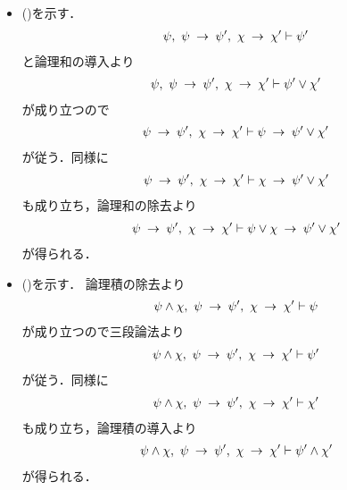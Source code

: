 	\begin{sketch}\mbox{}
		\begin{itemize}
			\item ()を示す．
				\begin{align}
					\psi,\ \psi \rarrow \psi',\ \chi \rarrow \chi' \vdash \psi'
				\end{align}
				と論理和の導入より
				\begin{align}
					\psi,\ \psi \rarrow \psi',\ \chi \rarrow \chi' \vdash \psi' \vee \chi'
				\end{align}
				が成り立つので
				\begin{align}
					\psi \rarrow \psi',\ \chi \rarrow \chi' \vdash 
					\psi \rarrow \psi' \vee \chi'
				\end{align}
				が従う．同様に
				\begin{align}
					\psi \rarrow \psi',\ \chi \rarrow \chi' \vdash 
					\chi \rarrow \psi' \vee \chi'
				\end{align}
				も成り立ち，論理和の除去より
				\begin{align}
					\psi \rarrow \psi',\ \chi \rarrow \chi' \vdash 
					\psi \vee \chi \rarrow \psi' \vee \chi'
				\end{align}
				が得られる．
				
			\item ()を示す．
				論理積の除去より
				\begin{align}
					\psi \wedge \chi,\ \psi \rarrow \psi',\ \chi \rarrow \chi' 
					\vdash \psi
				\end{align}
				が成り立つので三段論法より
				\begin{align}
					\psi \wedge \chi,\ \psi \rarrow \psi',\ \chi \rarrow \chi' 
					\vdash \psi'
				\end{align}
				が従う．同様に
				\begin{align}
					\psi \wedge \chi,\ \psi \rarrow \psi',\ \chi \rarrow \chi' 
					\vdash \chi'
				\end{align}
				も成り立ち，論理積の導入より
				\begin{align}
					\psi \wedge \chi,\ \psi \rarrow \psi',\ \chi \rarrow \chi' 
					\vdash \psi' \wedge \chi'
				\end{align}
				が得られる．
				

\end{itemize}
\end{sketch}
